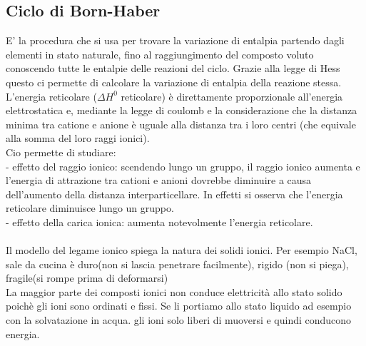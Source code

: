 \subsection{Ciclo di Born-Haber}
E' la procedura che si usa per trovare la variazione di entalpia partendo dagli elementi in stato naturale, fino al raggiungimento del composto voluto conoscendo tutte le entalpie delle reazioni del ciclo. Grazie alla legge di Hess questo ci permette di calcolare la variazione di entalpia della reazione stessa.\\
L’energia reticolare ($\Delta H^0$ reticolare) è direttamente proporzionale all’energia elettrostatica e, mediante la legge di coulomb e la considerazione che la distanza minima tra catione e anione è uguale alla distanza tra i loro centri (che equivale alla somma del loro raggi ionici). \\
Cio permette di studiare:\\
\tab- effetto del raggio ionico: scendendo lungo un gruppo, il raggio ionico aumenta e l’energia di attrazione tra cationi e anioni dovrebbe diminuire a causa dell’aumento della distanza interparticellare. In effetti si osserva che l’energia reticolare diminuisce lungo un gruppo. \\
\tab- effetto della carica ionica: aumenta notevolmente l’energia reticolare. \\\\
Il modello del legame ionico spiega la natura dei solidi ionici. Per esempio NaCl, sale da cucina è duro(non si lascia penetrare facilmente), rigido (non si piega), fragile(si rompe prima di deformarsi)\\
La maggior parte dei composti ionici non conduce elettricità allo stato solido poichè gli ioni sono ordinati e fissi. Se li portiamo allo stato liquido ad esempio con la solvatazione in acqua. gli ioni solo liberi di muoversi e quindi conducono energia. 
